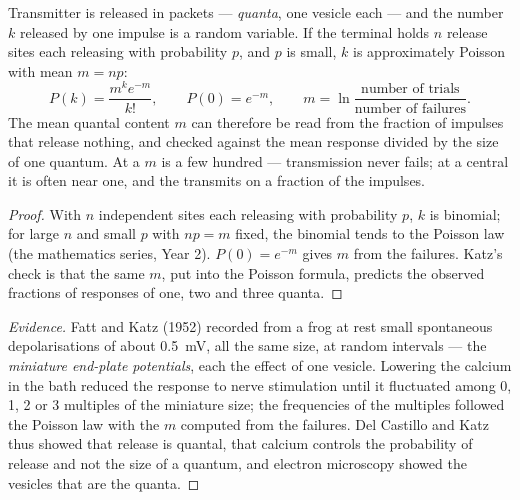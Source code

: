\begin{theorem}\label{thm:b2:neurons-synapses:quantal}
Transmitter is released in packets --- \emph{quanta}, one vesicle
each --- and the number $k$ released by one impulse is a random
variable. If the terminal holds $n$ release sites each releasing
with probability $p$, and $p$ is small, $k$ is approximately Poisson
with mean $m = np$:
\[
P(k) = \frac{m^{k}e^{-m}}{k!}, \qquad P(0) = e^{-m}, \qquad
m = \ln\frac{\text{number of trials}}{\text{number of failures}}.
\]
The mean quantal content $m$ can therefore be read from the
fraction of impulses that release nothing, and checked against the
mean response divided by the size of one quantum. At a
 $m$ is a few hundred --- transmission never
fails; at a central  it is often near one, and the 
transmits on a fraction of the impulses.
\end{theorem}
\begin{proof}
With $n$ independent sites each releasing with probability $p$, $k$
is binomial; for large $n$ and small $p$ with $np = m$ fixed, the
binomial tends to the Poisson law (the mathematics series, Year 2).
$P(0) = e^{-m}$ gives $m$ from the failures. Katz's check is that
the same $m$, put into the Poisson formula, predicts the observed
fractions of responses of one, two and three quanta.
\end{proof}
\begin{proof}[Evidence]
Fatt and Katz (1952) recorded from a frog  at rest
small spontaneous depolarisations of about \qty{0.5}{mV}, all the
same size, at random intervals --- the \emph{miniature end-plate
potentials}, each the effect of one vesicle. Lowering the calcium in
the bath reduced the response to nerve stimulation until it
fluctuated among 0, 1, 2 or 3 multiples of the miniature size;
the frequencies of the multiples followed the Poisson law with the
$m$ computed from the failures. Del Castillo and Katz thus showed
that release is quantal, that calcium controls the probability of
release and not the size of a quantum, and electron microscopy
showed the vesicles that are the quanta.
\end{proof}

